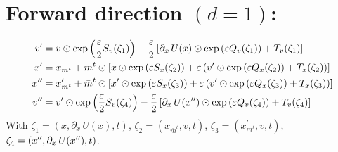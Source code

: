 \documentclass[../main.tex]{subfiles}
\begin{document}
\section{Forward direction \texorpdfstring{$(d = 1)$}{(d = 1)}:}%
\label{sec:lf_forward}
\begin{align}
  \vp &= v \odot \exp{\left(\frac{\eps}{2}S_{v}(\zeta_{1})\right)}%
        - \frac{\eps}{2}\left[\partial_{x}\,U(x)\odot \exp{\left(\eps
          Q_{v}(\zeta_{1})\right)}%
        + T_{v}(\zeta_{1})\right] \\
  \xp &= x_{\bar{m}^{t}} + m^{t}\odot \left[x \odot \exp{\left(\eps
    S_{x}(\zeta_{2})\right)}%
        + \eps\left(\vp\odot\exp{\left(\eps Q_{x}(\zeta_{2})\right)} 
          + T_{x}(\zeta_{2})\right)\right] \\
  \xpp &= x^{\prime}_{m^{t}} + \bar{m}^{t}\odot \left[\xp \odot \exp{\left(\eps
    S_{x}(\zeta_{3})\right)}%
        + \eps\left(\vp\odot\exp{\left(\eps Q_{x}(\zeta_{3})\right)} +
      T_{x}(\zeta_{3})\right)\right] \\
  \vpp &= \vp \odot \exp{\left(\frac{\eps}{2}S_{v}(\zeta_{4})\right)}%
        - \frac{\eps}{2}\left[\partial_{x}\,U(\xpp)\odot \exp{\left(\eps
          Q_{v}(\zeta_{4})\right)}%
          + T_{v}(\zeta_{4})\right]
\end{align} 
%
With $\zeta_{1} = (x, \partial_{x}\, U(x), t)$, $\zeta_{2} = (x_{\bar{m}^{t}},
v, t)$, $\zeta_{3} = (x^{\prime}_{m^{t}}, v, t)$, $\zeta_{4} = ({x^{\prime\prime}},
\partial_{x}\, U({x^{\prime\prime}}), t)$.
%
\end{document}
